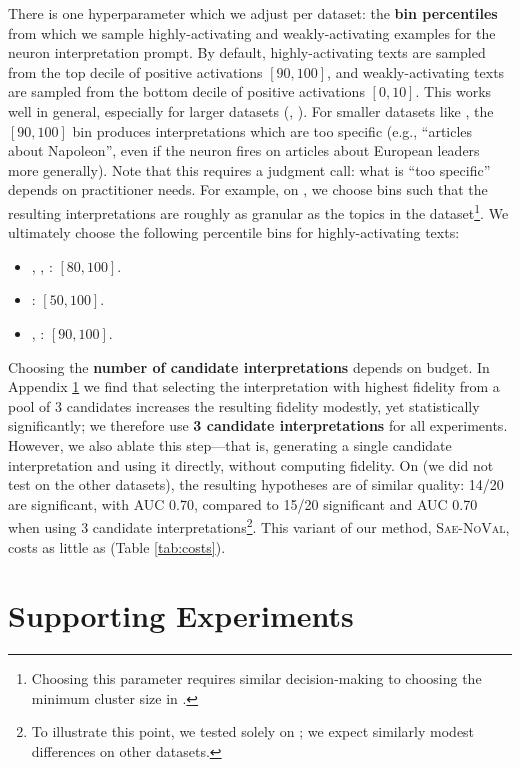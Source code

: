 There is one hyperparameter which we adjust per dataset: the \textbf{bin percentiles} from which we sample highly-activating and weakly-activating examples for the neuron interpretation prompt.
By default, highly-activating texts are sampled from the top decile of positive activations $[90, 100]$, and weakly-activating texts are sampled from the bottom decile of positive activations $[0, 10]$.
This works well in general, especially for larger datasets (\yelp, \congress).
For smaller datasets like \wiki, the $[90, 100]$ bin produces interpretations which are too specific (e.g., ``articles about Napoleon'', even if the neuron fires on articles about European leaders more generally).
Note that this requires a judgment call: what is ``too specific'' depends on practitioner needs.
For example, on \wiki, we choose bins such that the resulting interpretations are roughly as granular as the topics in the dataset\footnote{Choosing this parameter requires similar decision-making to choosing the minimum cluster size in \bertopic.}. 
We ultimately choose the following percentile bins for highly-activating texts:

\begin{itemize}
    \item {}, , \headlines: $[80, 100]$.
    \item \bills: $[50, 100]$.
    \item \yelp, \congress: $[90, 100]$.
\end{itemize}

Choosing the \textbf{number of candidate interpretations} depends on budget. 
In Appendix \ref{sec:autointerp_expts} we find that selecting the interpretation with highest fidelity from a pool of 3 candidates increases the resulting fidelity modestly, yet statistically significantly; we therefore use \textbf{3 candidate interpretations} for all experiments.
However, we also ablate this step—that is, generating a single candidate interpretation and using it directly, without computing fidelity. 
On \congress (we did not test on the other datasets), the resulting hypotheses are of similar quality: 14/20 are significant, with AUC 0.70, compared to 15/20 significant and AUC 0.70 when using 3 candidate interpretations\footnote{To illustrate this point, we tested solely on \congress; we expect similarly modest differences on other datasets.}. 
This variant of our method, \textsc{Sae-NoVal}, costs as little as \bertopic (Table \ref{tab:costs}). 

\section{Supporting Experiments}
\label{sec:autointerp_expts}

